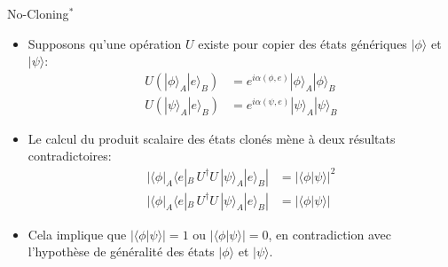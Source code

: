 \documentclass[aspectratio=169,12pt]{beamer}
\begin{document}
\begin{frame}{No-Cloning$^*$}
    \begin{itemize}
        \item Supposons qu'une opération $U$ existe pour copier des états génériques $|\phi \rangle$ et $|\psi \rangle$:
        \begin{align*}
            U(|\phi \rangle _{A}|e\rangle _{B}) &= e^{i\alpha (\phi ,e)}|\phi \rangle _{A}|\phi \rangle _{B} \\
            U(|\psi \rangle _{A}|e\rangle _{B}) &= e^{i\alpha (\psi ,e)}|\psi \rangle _{A}|\psi \rangle _{B}
        \end{align*}
        \item Le calcul du produit scalaire des états clonés mène à deux résultats contradictoires:
        \begin{align*}
            | \langle \phi|_{A}\langle e|_{B} \, U^\dagger U \, |\psi \rangle _{A}|e\rangle _{B} | &= | \langle \phi |\psi \rangle |^{2} \\
            | \langle \phi|_{A}\langle e|_{B} \, U^\dagger U \, |\psi \rangle _{A}|e\rangle _{B} | &= | \langle \phi |\psi \rangle |
        \end{align*}
        \item Cela implique que $|\langle \phi |\psi \rangle |=1$ ou $|\langle \phi |\psi \rangle |=0$, en contradiction avec l'hypothèse de généralité des états $|\phi \rangle$ et $|\psi \rangle$.
    \end{itemize}
\end{frame}
\end{document}
